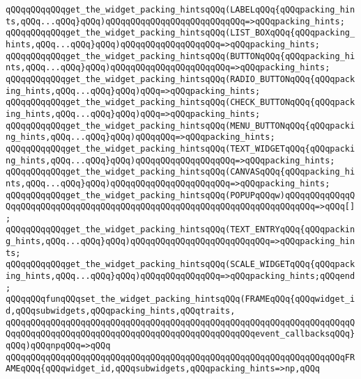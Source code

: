 \verb|qQQqqQQqqQQqget_the_widget_packing_hintsqQQq(LABELqQQq{qQQqpacking_hints,qQQq...qQQq}qQQq)qQQqqQQqqQQqqQQqqQQqqQQqqQQq=>qQQqpacking_hints;|\newline
\verb|qQQqqQQqqQQqget_the_widget_packing_hintsqQQq(LIST_BOXqQQq{qQQqpacking_hints,qQQq...qQQq}qQQq)qQQqqQQqqQQqqQQqqQQq=>qQQqpacking_hints;|\newline
\verb|qQQqqQQqqQQqget_the_widget_packing_hintsqQQq(BUTTONqQQq{qQQqpacking_hints,qQQq...qQQq}qQQq)qQQqqQQqqQQqqQQqqQQqqQQq=>qQQqpacking_hints;|\newline
\verb|qQQqqQQqqQQqget_the_widget_packing_hintsqQQq(RADIO_BUTTONqQQq{qQQqpacking_hints,qQQq...qQQq}qQQq)qQQq=>qQQqpacking_hints;|\newline
\verb|qQQqqQQqqQQqget_the_widget_packing_hintsqQQq(CHECK_BUTTONqQQq{qQQqpacking_hints,qQQq...qQQq}qQQq)qQQq=>qQQqpacking_hints;|\newline
\verb|qQQqqQQqqQQqget_the_widget_packing_hintsqQQq(MENU_BUTTONqQQq{qQQqpacking_hints,qQQq...qQQq}qQQq)qQQqqQQq=>qQQqpacking_hints;|\newline
\verb|qQQqqQQqqQQqget_the_widget_packing_hintsqQQq(TEXT_WIDGETqQQq{qQQqpacking_hints,qQQq...qQQq}qQQq)qQQqqQQqqQQqqQQqqQQq=>qQQqpacking_hints;|\newline
\verb|qQQqqQQqqQQqget_the_widget_packing_hintsqQQq(CANVASqQQq{qQQqpacking_hints,qQQq...qQQq}qQQq)qQQqqQQqqQQqqQQqqQQqqQQq=>qQQqpacking_hints;|\newline
\verb|qQQqqQQqqQQqget_the_widget_packing_hintsqQQq(POPUPqQQqw)qQQqqQQqqQQqqQQqqQQqqQQqqQQqqQQqqQQqqQQqqQQqqQQqqQQqqQQqqQQqqQQqqQQqqQQqqQQq=>qQQq[];|\newline
\verb|qQQqqQQqqQQqget_the_widget_packing_hintsqQQq(TEXT_ENTRYqQQq{qQQqpacking_hints,qQQq...qQQq}qQQq)qQQqqQQqqQQqqQQqqQQqqQQqqQQq=>qQQqpacking_hints;|\newline
\verb|qQQqqQQqqQQqget_the_widget_packing_hintsqQQq(SCALE_WIDGETqQQq{qQQqpacking_hints,qQQq...qQQq}qQQq)qQQqqQQqqQQqqQQq=>qQQqpacking_hints;qQQqend;|\newline
\newline
\verb|qQQqqQQqfunqQQqset_the_widget_packing_hintsqQQq(FRAMEqQQq{qQQqwidget_id,qQQqsubwidgets,qQQqpacking_hints,qQQqtraits,|\newline
\verb|qQQqqQQqqQQqqQQqqQQqqQQqqQQqqQQqqQQqqQQqqQQqqQQqqQQqqQQqqQQqqQQqqQQqqQQqqQQqqQQqqQQqqQQqqQQqqQQqqQQqqQQqqQQqqQQqqQQqqQQqevent_callbacksqQQq}qQQq)qQQqnpqQQq=>qQQq|\newline
\verb|qQQqqQQqqQQqqQQqqQQqqQQqqQQqqQQqqQQqqQQqqQQqqQQqqQQqqQQqqQQqqQQqqQQqFRAMEqQQq{qQQqwidget_id,qQQqsubwidgets,qQQqpacking_hints=>np,qQQq|\newline
